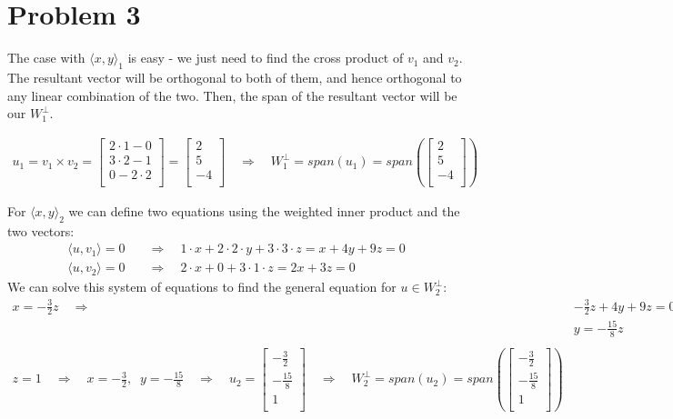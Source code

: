 \documentclass[10pt,letter]{article}
\newcommand{\inr}[2]{\langle #1, #2\rangle}
\begin{document}
\pagebreak

\section*{Problem 3}

The case with $\inr{x}{y}_1$ is easy - we just need to find the cross product of $v_1$ and $v_2$. The resultant vector will be orthogonal to both of them, and hence orthogonal to any linear combination of the two. Then, the span of the resultant vector will be our $W^\bot_1$.

\begin{align*}
u_1 = v_1 \times v_2 = 
\left[ {\begin{array}{c}
 2 \cdot 1 - 0 \\
 3 \cdot 2 - 1 \\
 0 - 2 \cdot 2 \\
\end{array} } \right]
= 
\left[ {\begin{array}{c}
 2 \\
 5 \\
 -4 \\
\end{array} } \right]
\quad \Rightarrow \quad W^\bot_1 = span (u_1) = span(
\left[ {\begin{array}{c}
 2 \\
 5 \\
 -4 \\
\end{array} } \right]
)
\end{align*}

For $\inr{x}{y}_2$ we can define two equations using the weighted inner product and the two vectors:
\begin{align*}
\inr{u}{v_1} = 0 &\quad \Rightarrow \quad 1 \cdot x + 2 \cdot 2 \cdot y + 3 \cdot 3 \cdot z = x + 4y + 9z = 0 
\\
\inr{u}{v_2} = 0 &\quad \Rightarrow \quad 2 \cdot x + 0 + 3 \cdot 1 \cdot z = 2x + 3z = 0
\end{align*}
We can solve this system of equations to find the general equation for $u \in W^\bot_2$:
\begin{align*}
x = -\frac{3}{2}z \quad \Rightarrow \quad &-\frac{3}{2}z + 4y +9z = 0
\\ & y = -\frac{15}{8}z
\\\\
z = 1 \quad \Rightarrow \quad x = -\frac{3}{2},\;\; y = -\frac{15}{8} \quad \Rightarrow \quad u_2 =
\left[ {\begin{array}{c}
 -\frac{3}{2} \\
 -\frac{15}{8} \\
 1 \\
\end{array} } \right]
\quad \Rightarrow \quad W^\bot_2 = span (u_2) = span(
\left[ {\begin{array}{c}
 -\frac{3}{2} \\
 -\frac{15}{8} \\
 1 \\
\end{array} } \right]
)
\end{align*}
\end{document}

